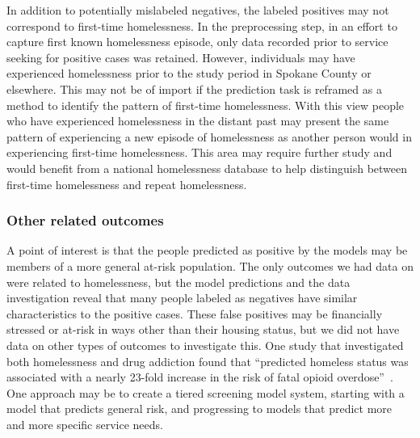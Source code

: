 \documentclass[10pt,letterpaper]{article}
\begin{document}
In addition to potentially mislabeled negatives, the labeled positives may not correspond to first-time homelessness. In the preprocessing step, in an effort to capture first known homelessness episode, only data recorded prior to service seeking for positive cases was retained. However, individuals may have experienced homelessness prior to the study period in Spokane County or elsewhere. This may not be of import if the prediction task is reframed as a method to identify the pattern of first-time homelessness. With this view people who have experienced homelessness in the distant past may present the same pattern of experiencing a new episode of homelessness as another person would in experiencing first-time homelessness. This area may require further study and would benefit from a national homelessness database to help distinguish between first-time homelessness and repeat homelessness.

\subsubsection*{Other related outcomes}
A point of interest is that the people predicted as positive by the models may be members of a more general at-risk population. The only outcomes we had data on were related to homelessness, but the model predictions and the data investigation reveal that many people labeled as negatives have similar characteristics to the positive cases. These false positives may be financially stressed or at-risk in ways other than their housing status, but we did not have data on other types of outcomes to investigate this. One study that investigated both homelessness and drug addiction found that ``predicted homeless status was associated with a nearly 23-fold increase in the risk of fatal opioid overdose''~\cite{byrne2020classification}. One approach may be to create a tiered screening model system, starting with a model that predicts general risk, and progressing to models that predict more and more specific service needs.
\end{document}
